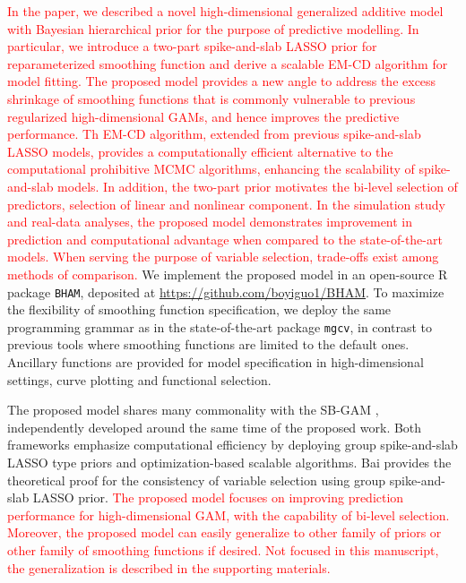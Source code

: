 \documentclass[AMA,STIX1COL,]{WileyNJD-v2}
\begin{document}
\textcolor{red}{In the paper, we described a novel high-dimensional generalized additive model with Bayesian hierarchical prior for the purpose of predictive modelling. In particular, we introduce a two-part spike-and-slab LASSO prior for reparameterized smoothing function and derive a scalable EM-CD algorithm for model fitting. The proposed model provides a new angle to address the excess shrinkage of smoothing functions that is commonly vulnerable to previous regularized high-dimensional GAMs, and hence improves the predictive performance. Th EM-CD algorithm, extended from previous spike-and-slab LASSO models, provides a computationally efficient alternative to the computational prohibitive MCMC algorithms, enhancing the scalability of spike-and-slab models. In addition, the two-part prior motivates the bi-level selection of predictors, selection of linear and nonlinear component. In the simulation study and real-data analyses, the proposed model demonstrates improvement in prediction and computational advantage when compared to the state-of-the-art models. When serving the purpose of variable selection, trade-offs exist among methods of comparison.}
We implement the proposed model in an open-source R package
\texttt{BHAM}, deposited at \url{https://github.com/boyiguo1/BHAM}. To
maximize the flexibility of smoothing function specification, we deploy
the same programming grammar as in the state-of-the-art package
\texttt{mgcv}, in contrast to previous tools where smoothing functions
are limited to the default ones. Ancillary functions are provided for
model specification in high-dimensional settings, curve plotting and
functional selection.

The proposed model shares many commonality with the SB-GAM
\citep{Bai2021}, independently developed around the same time of the
proposed work. Both frameworks emphasize computational efficiency by
deploying group spike-and-slab LASSO type priors and optimization-based
scalable algorithms. Bai provides the theoretical proof for the
consistency of variable selection using group spike-and-slab LASSO
prior.
\textcolor{red}{The proposed model focuses on improving prediction performance for high-dimensional GAM, with the capability of bi-level selection. Moreover, the proposed model can easily generalize to other family of priors or other family of smoothing functions if desired. Not focused in this manuscript, the generalization is described in the supporting materials.}
\end{document}
